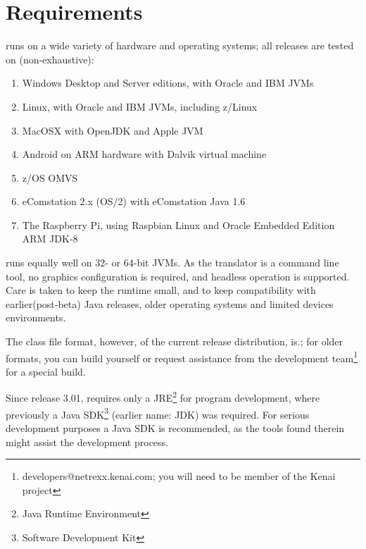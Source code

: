 \chapter{Requirements}
\nr{} \nrversion{} runs on a wide variety of
hardware and operating systems; all releases are tested on (non-exhaustive):
\begin{enumerate}
\item Windows Desktop and Server editions, with Oracle and IBM JVMs
\item Linux, with Oracle and IBM JVMs, including z/Linux
\item MacOSX with OpenJDK and Apple JVM
\item Android on ARM hardware with Dalvik virtual machine
\item z/OS OMVS
\item eComstation 2.x (OS/2) with eComstation Java 1.6
\item The Raspberry Pi, using Raspbian Linux and Oracle Embedded
  Edition ARM JDK-8
\end{enumerate}
\nr{} runs equally well on 32- or 64-bit JVMs. As the translator is
a command line tool, no graphics configuration is required, and
headless operation is supported. Care is taken to keep the \nr{} runtime small, and to keep
compatibility with earlier(post-beta) Java releases, older operating systems and
limited devices environments. 

The class file format, however, of the current release distribution, is.; for older formats, you
can build \nr{} yourself or request assistance from the development
team\footnote{developers@netrexx.kenai.com; you will
  need to be member of the Kenai \nr{} project} for a special build.
\begin{shaded}\noindent
Since release 3.01, \nr{} requires only a
JRE\footnote{Java Runtime Environment} for program development, where previously a
Java SDK\footnote{Software Development Kit} (earlier name: JDK) was required. For serious development
purposes a Java SDK is recommended, as the tools found therein might
assist the development process.
\end{shaded}\indent